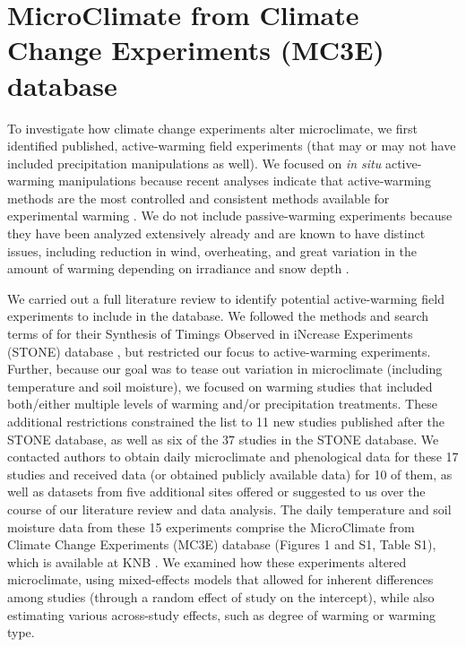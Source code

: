 \documentclass{article}
\begin{document}
\section* {MicroClimate from Climate Change Experiments (MC3E) database}
\par To investigate how climate change experiments alter microclimate, we first identified published, active-warming field experiments (that may or may not have included precipitation manipulations as well). We focused on \textit{in situ} active-warming manipulations because recent analyses indicate that active-warming methods are the most controlled and consistent methods available for experimental warming \citep{kimball2005,kimball2008,aronson2009,wolkovich2012}. We do not include passive-warming experiments because they have been analyzed extensively already and are known to have distinct issues, including reduction in wind, overheating, and great variation in the amount of warming depending on irradiance and snow depth \citep[][see also Table S2]{marion1997,shaver2000,wolkovich2012,bokhorst2013}.
\par We carried out a full literature review to identify potential active-warming field experiments to include in the database. We followed the methods and search terms of \citet{wolkovich2012} for their Synthesis of Timings Observed in iNcrease Experiments (STONE) database \citep{wolkovich2012}, but restricted our focus to active-warming experiments. Further, because our goal was to tease out variation in microclimate (including temperature and soil moisture), we focused on warming studies that included both/either multiple levels of warming and/or precipitation treatments. These additional restrictions constrained the list to 11 new studies published after the STONE database, as well as six of the 37 studies in the STONE database. We contacted authors to obtain daily microclimate and phenological data for these 17 studies and received data (or obtained publicly available data) for 10 of them, as well as datasets from five additional sites offered or suggested to us over the course of our literature review and data analysis. The daily temperature and soil moisture data from these 15 experiments comprise the MicroClimate from Climate Change Experiments (MC3E) database (Figures 1 and S1, Table S1), which is available at KNB \citep{ettinger2018}. We examined how these experiments altered microclimate, using mixed-effects models that allowed for inherent differences among studies (through a random effect of study on the intercept), while also estimating various across-study effects, such as degree of warming or warming type. 
\end{document}
